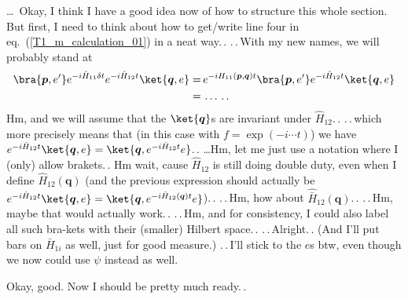 \documentclass{report}
\begin{document}
\ldots\ Okay, I think I have a good idea now of how to structure this whole section. But first, I need to think about how to get/write line four in eq.\ (\ref{T1_m_calculation_01}) in a neat way.\,. 
.\,.\,With my new names, we will probably stand at
\begin{align}
\begin{aligned}
		\bra{\boldsymbol{p}, e'}
			e^{-i  \hat H_{11} \delta t} e^{-i  \hat H_{12} t}
		\ket{\boldsymbol{q}, e} 
	=&\,
		e^{-i  H_{11}(\boldsymbol{p}, \boldsymbol{q}) t} 
		\bra{\boldsymbol{p}, e'}
			e^{-i  \hat H_{12} t}
		\ket{\boldsymbol{q}, e} 
	\\=&\,
		\ldots \,.\,.
\end{aligned}
\end{align} 
Hm, and we will assume that the $\ket{\boldsymbol{q}}$s are invariant under $\hat H_{12}$.\,. .\,.\,which more precisely means that (in this case with $f=\exp(-i \cdots t)$) we have $e^{-i  \hat H_{12} t} \ket{\boldsymbol{q}, e} = \ket{\boldsymbol{q}, e^{-i  \hat H_{12} t} e}$.\,. \ldots Hm, let me just use a notation where I (only) allow brakets.\,. Hm wait, cause $\hat H_{12}$ is still doing double duty, even when I define $\hat H_{12}(\boldsymbol{q})$ (and the previous expression should actually be $e^{-i  \hat H_{12} t} \ket{\boldsymbol{q}, e} = \ket{\boldsymbol{q}, e^{-i  \hat H_{12}(\boldsymbol{q}) t} e}$).\,. .\,.\,Hm, how about $\hat{\bar H}_{12}(\boldsymbol{q})$.\,. .\,.\,Hm, maybe that would actually work.\,. .\,.\,Hm, and for consistency, I could also label all such bra-kets with their (smaller) Hilbert space.\,. .\,.\,Alright.\,. (And I'll put bars on $\bar H_{1i}$ as well, just for good measure.) .\,.\,I'll stick to the $e$s btw, even though we now could use $\psi$ instead as well. 

Okay, good. Now I should be pretty much ready.\,. %

\end{document}
